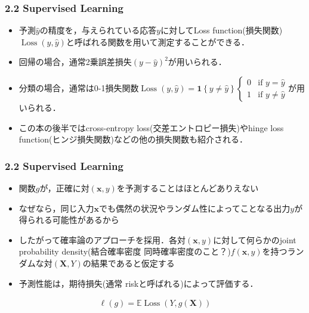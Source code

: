 \documentclass[dvipdfmx,cjk]{beamer}
\theoremstyle{example}
\DeclareMathOperator{\Loss}{Loss}
\begin{document}
\begin{frame}
    \frametitle{2.2 Supervised Learning}
    \begin{itemize}
        \item 予測$\hat{y}$の精度を，与えられている応答$y$に対してLoss function(損失関数)$\Loss (y,\hat{y})$と呼ばれる関数を用いて測定することができる．
        \item 回帰の場合，通常2乗誤差損失$(y-\hat{y})^2$が用いられる．
        \item 分類の場合，通常は0-1損失関数$\Loss (y,\hat{y})=\mathbf{1}\left\{y\neq \hat{y}\right\}\begin{cases}0&\text{if }y=\hat{y}\\1&\text{if }y\neq\hat{y}\end{cases}$が用いられる．
        \item この本の後半ではcross-entropy loss(交差エントロピー損失)やhinge loss function(ヒンジ損失関数)などの他の損失関数も紹介される．
    \end{itemize}
\end{frame}

\begin{frame}
    \frametitle{2.2 Supervised Learning}
    \begin{itemize}
        \item 関数$g$が，正確に対$(\boldsymbol{x},y)$を予測することはほとんどありえない
        \item なぜなら，同じ入力$\boldsymbol{x}$でも偶然の状況やランダム性によってことなる出力$y$が得られる可能性があるから
        \item したがって確率論のアプローチを採用．各対$(\boldsymbol{x},y)$に対して何らかのjoint probability density(結合確率密度 同時確率密度のこと？)$f(\boldsymbol{x},y)$を持つランダムな対$(\boldsymbol{X},Y)$の結果であると仮定する
        \item 予測性能は，期待損失(通常 riskと呼ばれる)によって評価する．
    \end{itemize}
    \begin{align*}
        \ell(g) = \mathbb{E} \Loss (Y,g(\boldsymbol{X}))
    \end{align*}
\end{frame}
\end{document}
